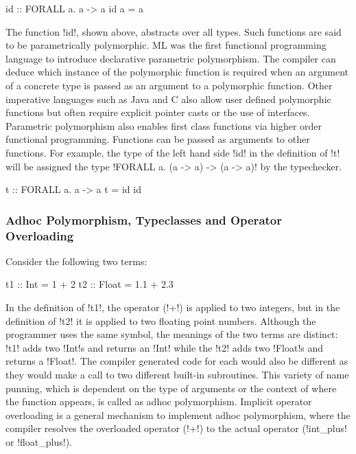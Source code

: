 \documentclass[manuscript,screen,nonacm]{acmart}
\begin{document}
\begin{CenteredBox}
\begin{code}
id :: FORALL a. a -> a
id a = a
\end{code}
\end{CenteredBox}
The function !id!, shown above, abstracts over all types. Such functions are said to be parametrically polymorphic\cite{strachey_fundamental_2000}. ML\cite{milner_logic_1975, milner_theory_1978} was the first functional programming language to introduce declarative parametric polymorphism. The compiler can deduce which instance of the polymorphic function is required when an argument of a concrete type is passed as an argument to a polymorphic function. Other imperative languages such as Java and C also allow user defined polymorphic functions but often require explicit pointer casts or the use of interfaces. Parametric polymorphism also enables first class functions via higher order functional programming. Functions can be passed as arguments to other functions. For example, the type of the left hand side !id! in the definition of !t! will be assigned the type !FORALL a. (a -> a) -> (a -> a)! by the typechecker.

\begin{CenteredBox}
\begin{code}
t :: FORALL a. a -> a
t = id id
\end{code}
\end{CenteredBox}

\subsubsection{Adhoc Polymorphism, Typeclasses and Operator Overloading}
Consider the following two terms:

\begin{CenteredBox}
\begin{code}
t1 :: Int = 1 + 2
t2 :: Float = 1.1 + 2.3
\end{code}
\end{CenteredBox}
In the definition of !t1!, the operator (!+!) is applied to two integers, but in the definition of !t2! it is applied to two floating point numbers. Although the programmer uses the same symbol, the meanings of the two terms are distinct: !t1! adds two !Int!s and returns an !Int! while the !t2! adds two !Float!s and returns a !Float!. The compiler generated code for each would also be different as they would make a call to two different built-in subroutines. This variety of name punning, which is dependent on the type of arguments or the context of where the function appears, is called as adhoc polymorphism\cite{strachey_fundamental_2000}. Implicit operator overloading is a general mechanism to implement adhoc polymorphism, where the compiler resolves the overloaded operator (!+!) to the actual operator (!int_plus! or !float_plus!).
\end{document}
